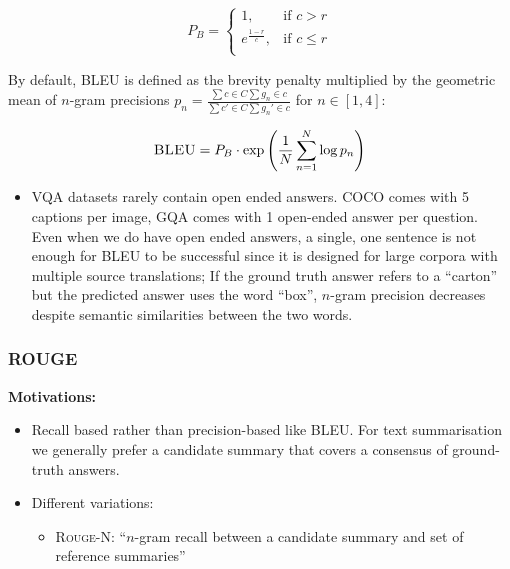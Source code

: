 \begin{equation*}
    P_B = \begin{cases}
    1, &\text{if } c > r\\
    e^{\frac{1-r}{c}}, &\text{if } c \leq r\\
    \end{cases}
\end{equation*}


By default, BLEU is defined as the brevity penalty multiplied by the geometric mean of \(n\)-gram precisions \(p_n = \frac{\sum{c \in C} \sum g_n \in c }{\sum{c' \in C} \sum g_n' \in c}\) for \(n \in [1, 4]\):

\begin{equation*}
    \textsc{BLEU} = P_B \cdot \exp \left(\frac{1}{N} \sum_{n=1}^N \log p_n\right)
\end{equation*}

\begin{itemize}
    \item VQA datasets rarely contain open ended answers. COCO comes with 5 captions per image, GQA comes with 1 open-ended answer per question. Even when we do have open ended answers, a single, one sentence is not enough for BLEU to be successful since it is designed for large corpora with multiple source translations; If the ground truth answer refers to a ``carton'' but the predicted answer uses the word ``box'', \(n\)-gram precision decreases despite semantic similarities between the two words. 
\end{itemize}

\subsubsection{ROUGE}

\textbf{Motivations:}

\begin{itemize}
    \item Recall based rather than precision-based like BLEU. For text summarisation we generally prefer a candidate summary that covers a consensus of ground-truth answers.
    \item Different variations:
    \begin{itemize}
        \item \textsc{Rouge-N}: ``\(n\)-gram recall between a candidate summary and set of reference summaries''
    \end{itemize}
\end{itemize}

